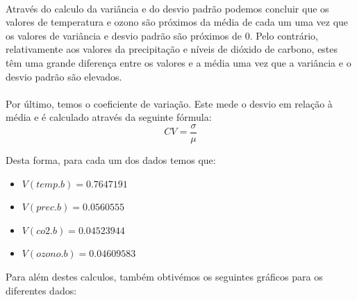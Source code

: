 \documentclass{article}
\begin{document}
		\paragraph{}
			Através do calculo da variância e do desvio padrão podemos concluir que os valores de temperatura e ozono são próximos da média de cada um uma vez que os valores de variância e desvio padrão são próximos de 0. Pelo contrário, relativamente aos valores da precipitação e níveis de dióxido de carbono, estes têm uma grande diferença entre os valores e a média uma vez que a variância e o desvio padrão são elevados.  
		\paragraph{}

		Por último, temos o coeficiente de variação. Este mede o desvio em relação à média e é calculado através da seguinte fórmula:
		\begin{equation*}
			CV = \frac{\sigma}{\mu}
		\end{equation*}

		Desta forma, para cada um dos dados temos que:
		\begin{itemize}
			\item $V(temp.b) = 0.7647191$
			\item $V(prec.b) = 0.0560555$
			\item $V(co2.b) = 0.04523944$
			\item $V(ozono.b) = 0.04609583$
		\end{itemize}

		Para além destes calculos, também obtivémos os seguintes gráficos para os diferentes dados:
				
\end{document}
